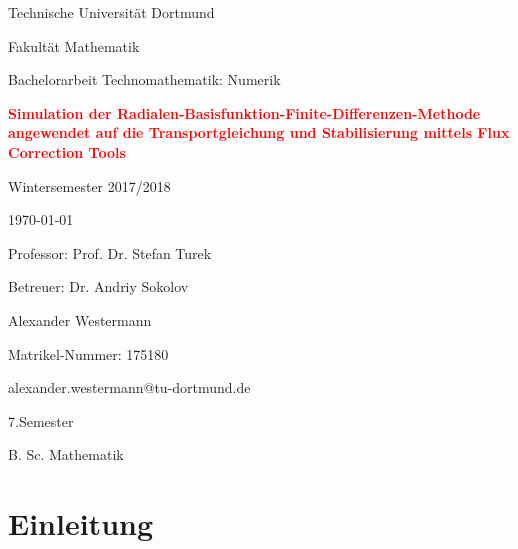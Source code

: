 \documentclass[a4paper,11pt]{article}
\begin{document}
\begin{titlepage}
 \centering
 {\LARGE Technische Universität Dortmund \par}
 \vspace{0.5cm}
 {\LARGE Fakultät Mathematik \par}
 \vspace{1cm}
 {\Large Bachelorarbeit Technomathematik: Numerik \par}
 \vspace{2cm}
 {\huge\bfseries \textcolor{red}{Simulation der Radialen-Basisfunktion-Finite-Differenzen-Methode angewendet auf die Transportgleichung und Stabilisierung mittels Flux Correction Tools} \par}
 \vspace{2cm}
 {\Large Wintersemester 2017/2018 \par}
 \vspace{0.5cm}
 {\large \today\par}
 \vspace{2cm}
 {\Large Professor: Prof. Dr. Stefan Turek \par}
 \vspace{0.5cm}
 {\Large Betreuer: Dr. Andriy Sokolov \par}
 \vfill
 \begin{flushright}
  {Alexander Westermann \par}
  {Matrikel-Nummer: 175180 \par}
  \vspace{0.5cm}
  {alexander.westermann@tu-dortmund.de \par}
  {7.Semester \par}
  {B. Sc. Mathematik \par}
 \end{flushright}
\end{titlepage}
\pagebreak
{}
 \tableofcontents
\pagebreak
\listoffigures
\pagebreak
{}
\setcounter{page}{1}
\section{Einleitung}
\pagebreak
\end{document}
